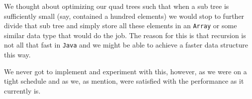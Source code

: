 We thought about optimizing our quad trees such that when a sub tree is sufficiently small (say, contained a hundred elements) we would stop to further divide that sub tree and simply store all these elements in an \texttt{Array} or some similar data type that would do the job. The reason for this is that recursion is not all that fast in \texttt{Java} and we might be able to achieve a faster data structure this way.

We never got to implement and experiment with this, however, as we were on a tight schedule and as we, as mention, were satisfied with the performance as it currently is.